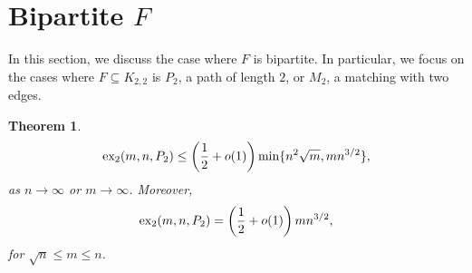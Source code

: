 \documentclass[10pt, reqno]{report}
\newtheorem{theorem}{Theorem}[chapter]
\newcommand*{\dex}{\textnormal{ex}_2}
\begin{document}
\section{Bipartite $F$}

In this section, we discuss the case where $F$ is bipartite. In particular, we focus on the cases where $F \subseteq K_{2, 2}$ is $P_2$, a path of length $2$, or $M_2$, a matching with two edges.

\begin{theorem}
  \[
    \dex(m, n, P_2) \leq \left(\frac{1}{2} + o(1)\right)\min\{n^{2}\sqrt{m}, mn^{3/2}\},
  \]
  as $n \to \infty$ or $m \to \infty$. Moreover, 
  \[
    \dex(m, n, P_2) = \left(\frac{1}{2} + o(1)\right)mn^{3/2},
  \]
  for $\sqrt{n} \leq m \leq n$.
\end{theorem}
\end{document}
